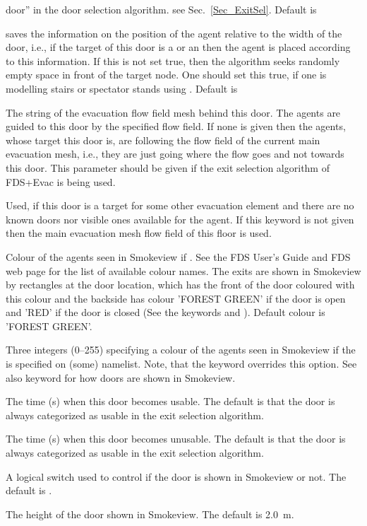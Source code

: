 \documentclass[12pt,a4paper,final,twoside]{stylevk}
\begin{document}
\begin{description}
  door'' in the door selection algorithm. see Sec.~\ref{Sec_ExitSel}.
  Default is 
%
\item[\Timts{KEEP\_XY}] saves the information on the position of the
  agent relative to the width of the door, i.e., if the target
  of this door is a  or an  then the agent is
  placed according to this information.  If this is not set true, then
  the algorithm seeks randomly empty space in front of the target
  node.  One should set this true, if one is modelling stairs or
  spectator stands using .  Default is 
%
\item[\Timts{VENT\_FFIELD}] The  string of the evacuation
  flow field mesh behind this door.  The agents are guided to this
  door by the specified flow field.  If none is given then the agents,
  whose target this door is, are following the flow field of the
  current main evacuation mesh, i.e., they are just going where
  the flow goes and not towards this door.  This parameter should be
  given if the exit selection algorithm of FDS+Evac is being used.
%
\item[\Timts{FLOW\_FIELD\_ID}] Used, if this door is a target for some
  other evacuation element and there are no known doors nor visible
  ones available for the agent.  If this keyword is not given then the
  main evacuation mesh flow field of this floor is used.
%
\item[\Timts{COLOR}] Colour of the agents seen in Smokeview if
  .  See the FDS User's Guide and FDS web page
  for the list of available colour names.  The exits are shown in
  Smokeview by rectangles at the door location, which has the front of
  the door coloured with this colour and the backside has colour
  'FOREST GREEN' if the door is open and 'RED' if the door is closed
  (See the keywords  and ).
  Default colour is 'FOREST GREEN'.
%
\item[\Timts{RGB}] Three integers (0--255) specifying a colour of the
  agents seen in Smokeview if the  is specified
  on (some)  namelist.  Note, that the 
  keyword overrides this option.  See also  keyword for
  how doors are shown in Smokeview.
%
\item[\Timts{TIME\_OPEN}] The time (s) when this door becomes usable.
  The default is that the door is always categorized as usable in the
  exit selection algorithm.
%
\item[\Timts{TIME\_CLOSE}] The time (s) when this door becomes
  unusable.  The default is that the door is always categorized as
  usable in the exit selection algorithm.
%
\item[\Timts{SHOW}] A logical switch used to control if the door is
  shown in Smokeview or not.  The default is .
%
\item[\Timts{HEIGHT}] The height of the door shown in Smokeview.  The
  default is 2.0~m.
%
\end{description}
\end{document}
